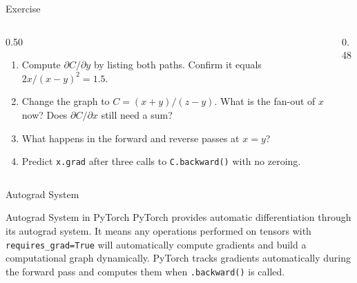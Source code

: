 \documentclass[aspectratio=169,xcolor=dvipsnames,svgnames,x11names,fleqn]{beamer}
\begin{document}
\begin{frame}{Exercise}
\begin{columns}[T]
\begin{column}{0.50\textwidth}
\small
\begin{enumerate}
\item Compute $\partial C / \partial y$ by listing both paths. Confirm
      it equals $2x/(x-y)^2 = 1.5$.
\item Change the graph to $C = (x + y)/(z - y)$. What is the fan-out
      of $x$ now? Does $\partial C/\partial x$ still need a sum?
\item What happens in the forward and reverse passes at $x = y$?
\item Predict \texttt{x.grad} after three calls to
      \texttt{C.backward()} with no zeroing.
\end{enumerate}
\end{column}
\begin{column}{0.48\textwidth}
\centering
{}
\end{column}
\end{columns}
\end{frame}


\begin{frame}[containsverbatim]{Autograd System} 
\begin{talert}{Autograd System in PyTorch}
PyTorch provides automatic differentiation through its autograd system. It means any operations performed on tensors with \texttt{requires\_grad=True} will automatically compute gradients and build a computational graph dynamically. PyTorch tracks gradients automatically during the forward pass and computes them when \texttt{.backward()} is called.
\end{talert}
\end{frame}
\end{document}
